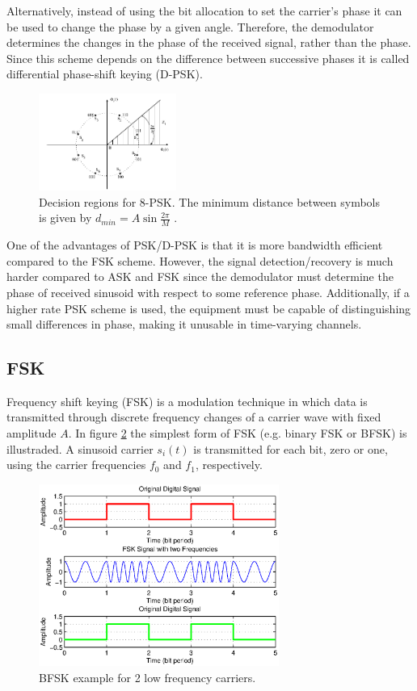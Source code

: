 \documentclass[12pt,a4paper,openright]{report}
\begin{document}
  
 Alternatively, instead of using the bit allocation to set the carrier's phase it can be used to change the phase by a given angle. Therefore, the demodulator determines the changes in the phase of the received signal, rather than the phase. Since this scheme depends on the difference between successive phases it is called differential phase-shift keying (D-PSK). 
 \begin{figure}[H]
  \centering
    \includegraphics[width=0.4\textwidth]{PSKmodulation.png}
    \caption[Decision regions for 8-PSK]{Decision regions for 8-PSK. The minimum distance between symbols is given by $d_{min}=A\sin\frac{2\pi}{M}$  \cite{XiongDigModTech}.}
    \label{fig:pskdr}
\end{figure}


One of the advantages of PSK/D-PSK is that it is more bandwidth efficient compared to the FSK scheme. However, the signal detection/recovery is much harder compared to ASK and FSK since the demodulator must determine the phase of received sinusoid with respect to some reference phase. Additionally, if a higher rate PSK scheme is used, the equipment must be capable of distinguishing small differences in phase, making it unusable in time-varying channels.

\subsection{FSK}
\label{subsec:fsk}
Frequency shift keying (FSK) is a modulation technique in which data is transmitted through discrete frequency changes of a carrier wave with fixed amplitude $A$.  In figure \ref{fig:fskex} the simplest form of FSK (e.g. binary FSK or BFSK) is illustraded. A sinusoid carrier $s_i(t)$ is transmitted for each bit, zero or one, using the carrier frequencies $f_0$ and $f_1$, respectively. 

\begin{figure}[H]
  \centering
    \includegraphics[width=0.7\textwidth]{fskexample.eps}
    \caption[BFSK example]{BFSK example for 2 low frequency carriers.}
    \label{fig:fskex}
\end{figure}
\end{document}
